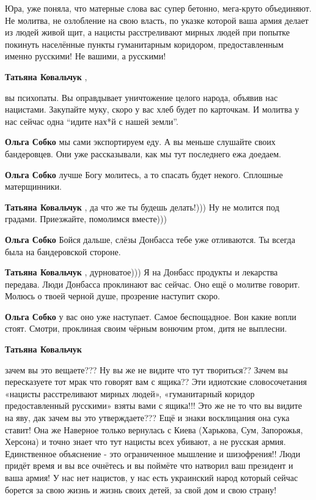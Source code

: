 \begin{itemize}

Юра, уже поняла, что матерные слова вас супер бетонно, мега-круто объединяют.
Не молитва, не озлобление на свою власть, по указке которой ваша армия делает
из людей живой щит, а нацисты расстреливают мирных людей при попытке покинуть
населённые пункты гуманитарным коридором, предоставленным именно русскими! Не
вашими, а русскими!

\begin{itemize} %
\textbf{Татьяна Ковальчук} , 

вы психопаты. Вы оправдывает уничтожение целого народа, объявив нас нацистами.
Закупайте муку, скоро у вас хлеб будет по карточкам. И молитва у нас сейчас
одна \enquote{идите нах*й с нашей земли}.

\textbf{Ольга Собко} мы сами экспортируем еду. А вы меньше слушайте своих бандеровцев. Они уже рассказывали, как мы тут последнего ежа доедаем.

\textbf{Ольга Собко} лучше Богу молитесь, а то спасать будет некого. Сплошные матерщинники.

\textbf{Татьяна Ковальчук} , да что же ты будешь делать!))) Ну не молится под градами. Приезжайте, помолимся вместе)))

\textbf{Ольга Собко} Бойся дальше, слёзы Донбасса тебе уже отливаются. Ты всегда была на бандеровской стороне.

\textbf{Татьяна Ковальчук} , дурноватое))) Я на Донбасс продукты и лекарства передава. Люди Донбасса проклинают вас сейчас. Оно ещё о молитве говорит. Молюсь о твоей черной душе, прозрение наступит скоро.

\textbf{Ольга Собко} у вас оно уже наступает. Самое беспощадное. Вон какие вопли стоят. Смотри, проклиная своим чёрным вонючим ртом, дитя не выплесни.

\textbf{Татьяна Ковальчук} 

зачем вы это вещаете??? Ну вы же не видите что тут твориться?? Зачем вы
пересказуете тот мрак что говорят вам с ящика?? Эти идиотские словосочетания
«нацисты расстреливают мирных людей», «гуманитарный коридор предоставленный
русскими» взяты вами с ящика!!! Это же не то что вы видите на яву, дак зачем вы
это утверждаете??? Ещё и знаки восклицания она сука ставит! Она же Наверное
только вернулась с Киева (Харькова, Сум, Запорожья, Херсона) и точно знает что
тут нацисты всех убивают, а не русская армия. Единственное объяснение - это
ограниченное мышление и шизофрения!! Люди придёт время и вы все очнётесь и вы
поймёте что натворил ваш президент и ваша армия! У нас нет нацистов, у нас есть
украинский народ который сейчас борется за свою жизнь и жизнь своих детей, за
свой дом и свою страну!



\end{itemize}
\end{itemize}
